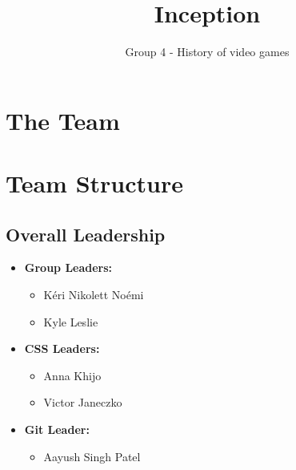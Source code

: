 \documentclass[a4paper,12pt]{article}
\title{\vspace{-2cm}\textbf{Inception}}
\author{Group 4 - History of video games}
\date{}
\begin{document}
\maketitle
\vspace{-1cm}

\section*{The Team}

\section*{Team Structure}

\subsection*{Overall Leadership}
\begin{itemize}[leftmargin=1.2cm]
    \item \textbf{Group Leaders:}
    \begin{itemize}[leftmargin=1.2cm]
        \item Kéri Nikolett Noémi
        \item Kyle Leslie
    \end{itemize}
    \item \textbf{CSS Leaders:}
    \begin{itemize}[leftmargin=1.2cm]
        \item Anna Khijo
        \item Victor Janeczko
    \end{itemize}
    \item \textbf{Git Leader:}
    \begin{itemize}[leftmargin=1.2cm]
        \item Aayush Singh Patel
    \end{itemize}
\end{itemize}

\vspace{0.5cm}
\end{document}
